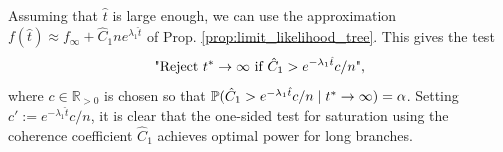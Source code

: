\begin{appendices}
\medskip
Assuming that $\hat{t}$ is large enough,
we can use the approximation ${f(\hat{t}) \approx  f_\infty + \hat{C}_1 n e^{\lambda_1 \hat{t}}}$ of Prop. \ref{prop:limit_likelihood_tree}. This gives the test 
\begin{equation}
    \text{"Reject $t^* \to \infty$ if $ \hat{C}_1  > e^{-\lambda_1 \hat{t}}c/n$",}
\end{equation}
 where $c \in \mathbb{R}_{>0}$ is chosen so that $\mathbb{P}( \hat{C}_1 > e^{-\lambda_1 \hat{t}}c/n \mid  t^* \to \infty) = \alpha$. Setting $c' := e^{-\lambda_1 \hat{t}}c/n$, it is clear that the one-sided test for saturation using the coherence coefficient $\hat{C}_1$ achieves optimal power for long branches. 




\end{appendices}
